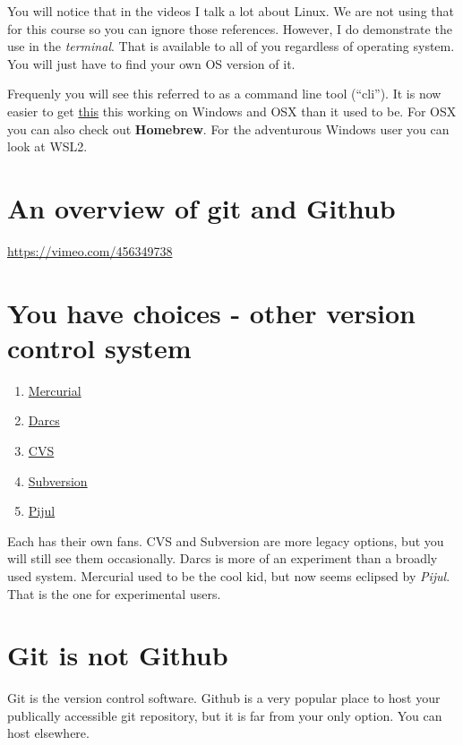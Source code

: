 \documentclass[
  letterpaper,
  DIV=11,
  numbers=noendperiod]{scrreprt}
\providecommand{\tightlist}{%
  \setlength{\itemsep}{0pt}\setlength{\parskip}{0pt}}\usepackage{longtable,booktabs,array}
\begin{document}
You will notice that in the videos I talk a lot about Linux. We are not
using that for this course so you can ignore those references. However,
I do demonstrate the use in the \emph{terminal}. That is available to
all of you regardless of operating system. You will just have to find
your own OS version of it.

Frequenly you will see this referred to as a command line tool
(``cli''). It is now easier to get \href{https://cli.github.com/}{this}
this working on Windows and OSX than it used to be. For OSX you can also
check out \textbf{Homebrew}. For the adventurous Windows user you can
look at WSL2.

\section{An overview of git and
Github}\label{an-overview-of-git-and-github}

\url{https://vimeo.com/456349738}

\section{You have choices - other version control
system}\label{you-have-choices---other-version-control-system}

\begin{enumerate}
\def\labelenumi{\arabic{enumi}.}
\tightlist
\item
  \href{https://www.mercurial-scm.org/}{Mercurial}
\item
  \href{http://darcs.net/}{Darcs}
\item
  \href{https://www.nongnu.org/cvs/}{CVS}
\item
  \href{https://subversion.apache.org/}{Subversion}
\item
  \href{https://pijul.org/}{Pijul}
\end{enumerate}

Each has their own fans. CVS and Subversion are more legacy options, but
you will still see them occasionally. Darcs is more of an experiment
than a broadly used system. Mercurial used to be the cool kid, but now
seems eclipsed by \emph{Pijul}. That is the one for experimental users.

\section{Git is not Github}\label{git-is-not-github}

Git is the version control software. Github is a very popular place to
host your publically accessible git repository, but it is far from your
only option. You can host elsewhere.
\end{document}
